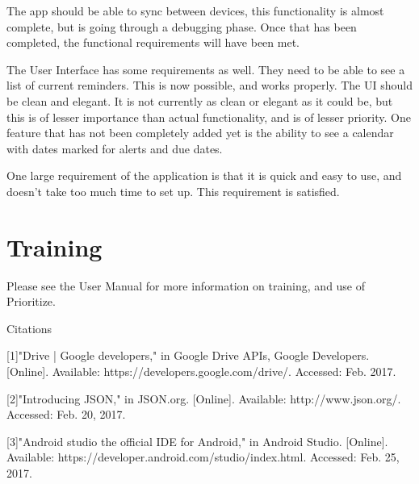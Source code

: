 \documentclass[12pt]{article}
\begin{document}
The app should be able to sync between devices, this functionality is almost complete, but is going through a debugging phase. Once that has been completed, the functional requirements will have been met.

The User Interface has some requirements as well. They need to be able to see a list of current reminders. This is now possible, and works properly. The UI should be clean and elegant. It is not currently as clean or elegant as it could be, but this is of lesser importance than actual functionality, and is of lesser priority. One feature that has not been completely added yet is the ability to see a calendar with dates marked for alerts and due dates. 

One large requirement of the application is that it is quick and easy to use, and doesn’t take too much time to set up. This requirement is satisfied. 


\section{Training}



Please see the User Manual for more information on training, and use of Prioritize.

\newpage



Citations

[1]"Drive | Google developers," in Google Drive APIs, Google Developers. [Online]. Available: https://developers.google.com/drive/. Accessed: Feb. 2017.


[2]"Introducing JSON," in JSON.org. [Online]. Available: http://www.json.org/. Accessed: Feb. 20, 2017.


[3]"Android studio the official IDE for Android," in Android Studio. [Online]. Available: https://developer.android.com/studio/index.html. Accessed: Feb. 25, 2017.
\end{document}
